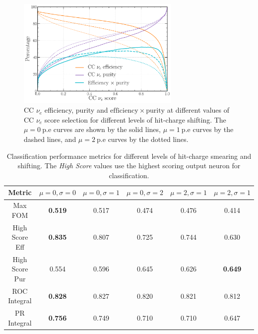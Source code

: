 \begin{figure} %
    \includegraphics[width=0.7\textwidth]{diagrams/7-results/calib_charge_shift_nuel_eff_curves.pdf}
    \caption[CC $\nu_{e}$ efficiency and purity curves for different levels of hit-charge shifting]
    {CC $\nu_{e}$ efficiency, purity and $\mathrm{efficiency}\times\mathrm{purity}$ at different
        values of CC $\nu_{e}$ score selection for different levels of hit-charge shifting. The
        $\mu=0~\mathrm{p.e}$ curves are shown by the solid lines, $\mu=1~\mathrm{p.e}$ curves by the
        dashed lines, and $\mu=2~\mathrm{p.e}$ curves by the dotted lines.}
    \label{fig:calib_charge_shift_nuel_eff_curves}
\end{figure}

\begin{table} %
    \begin{tabular}{cccccc}
        Metric         & $\mu=0,\sigma=0$ & $\mu=0,\sigma=1$ & $\mu=0,\sigma=2$ & $\mu=2,\sigma=1$ & $\mu=2,\sigma=1$ \\
        \midrule
        Max FOM        & \textbf{0.519}   & 0.517            & 0.474            & 0.476            & 0.414            \\
        High Score Eff & \textbf{0.835}   & 0.807            & 0.725            & 0.744            & 0.630            \\
        High Score Pur & 0.554            & 0.596            & 0.645            & 0.626            & \textbf{0.649}   \\
        ROC Integral   & \textbf{0.828}   & 0.827            & 0.820            & 0.821            & 0.812            \\
        PR Integral    & \textbf{0.756}   & 0.749            & 0.710            & 0.710            & 0.647            \\
    \end{tabular}
    \caption[Classification performance metrics for different levels of hit-charge smearing and shifting]
    {Classification performance metrics for different levels of hit-charge smearing and shifting.
        The \emph{High Score} values use the highest scoring output neuron for classification.}
    \label{tab:calib_time}
\end{table}

